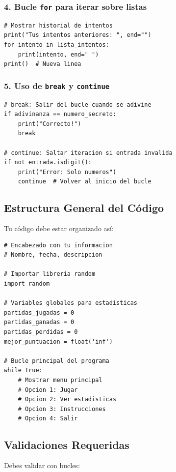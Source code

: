 \documentclass[12pt,a4paper]{article}
\begin{document}
\subsubsection{4. Bucle \texttt{for} para iterar sobre listas}

\begin{lstlisting}
# Mostrar historial de intentos
print("Tus intentos anteriores: ", end="")
for intento in lista_intentos:
    print(intento, end=" ")
print()  # Nueva linea
\end{lstlisting}

\subsubsection{5. Uso de \texttt{break} y \texttt{continue}}

\begin{lstlisting}
# break: Salir del bucle cuando se adivine
if adivinanza == numero_secreto:
    print("Correcto!")
    break

# continue: Saltar iteracion si entrada invalida
if not entrada.isdigit():
    print("Error: Solo numeros")
    continue  # Volver al inicio del bucle
\end{lstlisting}

\subsection{Estructura General del Código}

Tu código debe estar organizado así:

\begin{lstlisting}
# Encabezado con tu informacion
# Nombre, fecha, descripcion

# Importar libreria random
import random

# Variables globales para estadisticas
partidas_jugadas = 0
partidas_ganadas = 0
partidas_perdidas = 0
mejor_puntuacion = float('inf')

# Bucle principal del programa
while True:
    # Mostrar menu principal
    # Opcion 1: Jugar
    # Opcion 2: Ver estadisticas
    # Opcion 3: Instrucciones
    # Opcion 4: Salir
\end{lstlisting}

\subsection{Validaciones Requeridas}

Debes validar con bucles:
\end{document}

